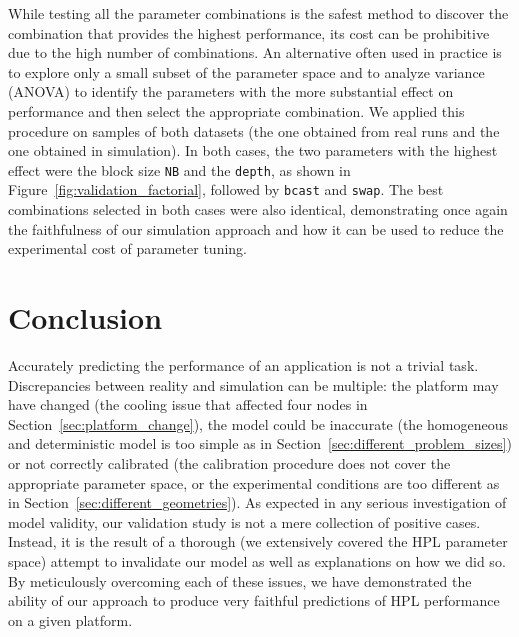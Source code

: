         While testing all the parameter combinations is the safest method to discover the combination that provides the
        highest performance, its cost can be prohibitive due to the high number of combinations. An alternative often
        used in practice is to explore only a small subset of the parameter space and to analyze variance (ANOVA) to
        identify the parameters with the more substantial effect on performance and then select the appropriate
        combination.  We applied this procedure on samples of both datasets (the one obtained from real runs and the one
        obtained in simulation). In both cases, the two parameters with the highest effect were the block size
        \texttt{NB} and the \texttt{depth}, as shown in Figure~\ref{fig:validation_factorial}, followed by
        \texttt{bcast} and \texttt{swap}. The best combinations selected in both cases were also identical,
        demonstrating once again the faithfulness of our simulation approach and how it can be used to reduce the
        experimental cost of parameter tuning.

    \section{Conclusion}%
        Accurately predicting the performance of an application is not a trivial task. Discrepancies between reality and
        simulation can be multiple: the platform may have changed (\eg the cooling issue that affected four nodes in
        Section~\ref{sec:platform_change}), the model could be inaccurate (\eg the homogeneous and deterministic \dgemm
        model is too simple as in Section~\ref{sec:different_problem_sizes}) or not correctly calibrated (\eg the
        calibration procedure does not cover the appropriate parameter space, or the experimental conditions are too
        different as in Section~\ref{sec:different_geometries}). As expected in any serious investigation of model
        validity, our validation study is not a mere collection of positive cases. Instead, it is the result of a
        thorough (we extensively covered the HPL parameter space) attempt to invalidate our model as well as
        explanations on how we did so. By meticulously overcoming each of these issues, we have demonstrated the ability
        of our approach to produce very faithful predictions of HPL performance on a given platform.

